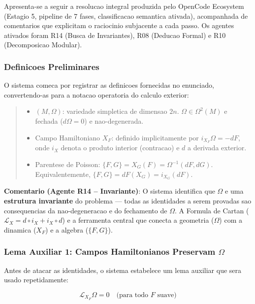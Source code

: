 \documentclass[5p]{elsarticle}
\begin{document}
Apresenta-se a seguir a resolucao integral produzida pelo OpenCode Ecosystem
(Estagio 5, pipeline de 7 fases, classificacao semantica ativada), acompanhada
de comentarios que explicitam o raciocinio subjacente a cada passo. Os agentes
ativados foram R14 (Busca de Invariantes), R08 (Deducao Formal) e R10
(Decomposicao Modular).

\subsubsection*{Definicoes Preliminares}

O sistema comeca por registrar as definicoes fornecidas no enunciado,
convertendo-as para a notacao operatoria do calculo exterior:

\begin{quote}
\begin{itemize}
  \item $(M,\Omega)$: variedade simpletica de dimensao $2n$.
        $\Omega \in \Omega^2(M)$ e fechada ($d\Omega = 0$) e nao-degenerada.
  \item Campo Hamiltoniano $X_F$: definido implicitamente por
        $i_{X_F}\Omega = -dF$, onde $i_X$ denota o produto interior
        (contracao) e $d$ a derivada exterior.
  \item Parentese de Poisson: $\{F,G\} = X_G(F) = \Omega^{-1}(dF,dG)$.
        Equivalentemente, $\{F,G\} = dF(X_G) = i_{X_G}(dF)$.
\end{itemize}
\end{quote}

\textbf{Comentario (Agente R14 -- Invariante)}: O sistema identifica que
$\Omega$ e uma \textbf{estrutura invariante} do problema --- todas as
identidades a serem provadas sao consequencias da nao-degeneracao e do
fechamento de $\Omega$. A Formula de Cartan ($\mathcal{L}_X = d \circ i_X
+ i_X \circ d$) e a ferramenta central que conecta a geometria ($\Omega$)
com a dinamica ($X_F$) e a algebra ($\{F,G\}$).

\subsubsection*{Lema Auxiliar 1: Campos Hamiltonianos Preservam $\Omega$}

Antes de atacar as identidades, o sistema estabelece um lema auxiliar
que sera usado repetidamente:

\begin{equation}
\mathcal{L}_{X_F}\Omega = 0 \quad\text{(para todo $F$ suave)}
\label{eq:lema1}
\end{equation}
\end{document}
